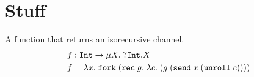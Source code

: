 
\section{Stuff}
\label{sec:stuff}

A function that returns an isorecursive channel.
\begin{align*}
  f &: \mathtt{Int} \rightarrow \mu X.\;{{}?\mathtt{Int}.X}
  \\
  f &= \lambda x.\; \mathtt{fork}\; (\mathtt{rec}\; g.\; \lambda c.\; (g\; (\mathtt{send}\; x \; (\mathtt{unroll}\; c))))
\end{align*}

